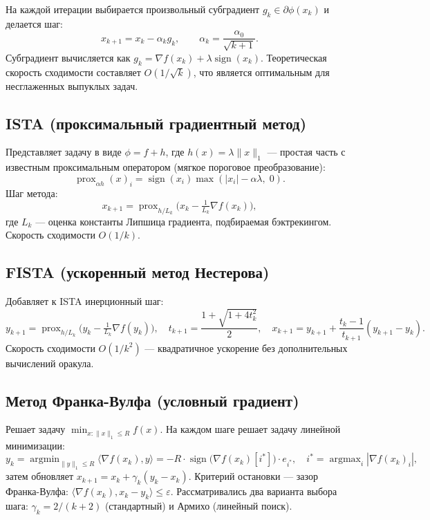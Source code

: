 \documentclass[a4paper,12pt]{article}
\begin{document}
На каждой итерации выбирается произвольный субградиент $g_k \in \partial \phi(x_k)$ и делается шаг:
\[
x_{k+1} = x_k - \alpha_k g_k, \qquad \alpha_k = \frac{\alpha_0}{\sqrt{k+1}}.
\]
Субградиент вычисляется как $g_k = \nabla f(x_k) + \lambda \operatorname{sign}(x_k)$.
Теоретическая скорость сходимости составляет $O(1/\sqrt{k})$, что является оптимальным для несглаженных выпуклых задач.

\subsection*{ISTA (проксимальный градиентный метод)}

Представляет задачу в виде $\phi = f + h$, где $h(x) = \lambda\|x\|_1$ — простая часть с известным
проксимальным оператором (мягкое пороговое преобразование):
\[
\operatorname{prox}_{\alpha h}(x)_i = \operatorname{sign}(x_i)\max(|x_i| - \alpha\lambda,\; 0).
\]
Шаг метода:
\[
x_{k+1} = \operatorname{prox}_{h/L_k}\!\bigl(x_k - \tfrac{1}{L_k}\nabla f(x_k)\bigr),
\]
где $L_k$ — оценка константы Липшица градиента, подбираемая бэктрекингом. Скорость сходимости $O(1/k)$.

\subsection*{FISTA (ускоренный метод Нестерова)}

Добавляет к ISTA инерционный шаг:
\[
y_{k+1} = \operatorname{prox}_{h/L_k}\!\bigl(y_k - \tfrac{1}{L_k}\nabla f(y_k)\bigr), \quad
t_{k+1} = \frac{1 + \sqrt{1 + 4t_k^2}}{2}, \quad
x_{k+1} = y_{k+1} + \frac{t_k - 1}{t_{k+1}}(y_{k+1} - y_k).
\]
Скорость сходимости $O(1/k^2)$ — квадратичное ускорение без дополнительных вычислений оракула.

\subsection*{Метод Франка-Вулфа (условный градиент)}

Решает задачу $\min_{x:\|x\|_1 \le R} f(x)$. На каждом шаге решает задачу линейной минимизации:
\[
y_k = \operatorname{argmin}_{\|y\|_1 \le R} \langle \nabla f(x_k), y \rangle = -R \cdot \operatorname{sign}\bigl(\nabla f(x_k)[i^*]\bigr) \cdot e_{i^*},
\quad i^* = \operatorname{argmax}_i |\nabla f(x_k)_i|,
\]
затем обновляет $x_{k+1} = x_k + \gamma_k (y_k - x_k)$.
Критерий остановки — зазор Франка-Вулфа: $\langle \nabla f(x_k), x_k - y_k \rangle \le \varepsilon$.
Рассматривались два варианта выбора шага: $\gamma_k = 2/(k+2)$ (стандартный) и Армихо (линейный поиск).
\end{document}
